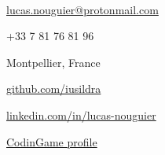 \begin{TopBar}{\ColorTextSide}
  \\
  \vspace{0.45cm}
  \vspace{-0.35cm}
  \begin{multicols}{2}
    \begin{ItemList}{\ColorHighlight}
      \item [\Large\faAt]\href{mailto:lucas.nouguier@protonmail.com}{lucas.nouguier@protonmail.com}\vspace{0.2cm}
      \item [\Large\faPhone] +33 7 81 76 81 96\vspace{0.2cm}
      \item [\Large\faHome] Montpellier, France
      \item [\Large\faGithub] \hspace{0.1cm}\href{https://github.com/iusildra}{github.com/iusildra}\vspace{0.2cm}
      \item [\Large\faLinkedinIn] \hspace{0.1cm}\href{https://www.linkedin.com/in/lucas-nouguier/}{linkedin.com/in/lucas-nouguier}\vspace{0.2cm}
      \item [\large\faCogs] \href{https://www.codingame.com/profile/c832985675af954f11f2aca8a8b676353164633}{CodinGame profile}\vspace{0.2cm}
    \end{ItemList}
  \end{multicols}
\end{TopBar}